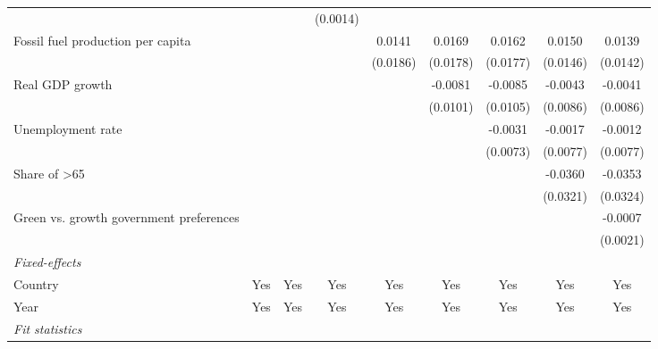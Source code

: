 \begin{table}[htbp]
\begin{tabular}{lcccccccc}
                                              &                 &                & (0.0014) &          &          &          &          &   \\   
      Fossil fuel production per capita       &                 &                &          & 0.0141   & 0.0169   & 0.0162   & 0.0150   & 0.0139\\   
                                              &                 &                &          & (0.0186) & (0.0178) & (0.0177) & (0.0146) & (0.0142)\\   
      Real GDP growth                         &                 &                &          &          & -0.0081  & -0.0085  & -0.0043  & -0.0041\\   
                                              &                 &                &          &          & (0.0101) & (0.0105) & (0.0086) & (0.0086)\\   
      Unemployment rate                       &                 &                &          &          &          & -0.0031  & -0.0017  & -0.0012\\   
                                              &                 &                &          &          &          & (0.0073) & (0.0077) & (0.0077)\\   
      Share of >65                            &                 &                &          &          &          &          & -0.0360  & -0.0353\\   
                                              &                 &                &          &          &          &          & (0.0321) & (0.0324)\\   
      Green vs. growth government preferences &                 &                &          &          &          &          &          & -0.0007\\   
                                              &                 &                &          &          &          &          &          & (0.0021)\\   
      \midrule
      \emph{Fixed-effects}\\
      Country                                 & Yes             & Yes            & Yes      & Yes      & Yes      & Yes      & Yes      & Yes\\  
      Year                                    & Yes             & Yes            & Yes      & Yes      & Yes      & Yes      & Yes      & Yes\\  
      \midrule
      \emph{Fit statistics}\\

\end{tabular}
\end{table}
